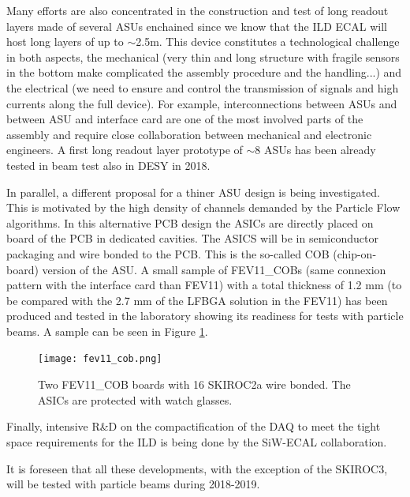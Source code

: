 \documentclass[a4paper,11pt]{article}
\begin{document}
Many efforts are also concentrated in the construction and test of long readout layers
made of several ASUs enchained since we know that the ILD ECAL will host long layers of up to $\sim$2.5m.
This device constitutes a technological challenge in both aspects, the mechanical
(very thin and long structure with fragile sensors in the bottom make complicated the assembly procedure and the handling...)
and the electrical (we need to ensure and control the transmission of signals and high currents along the full device).
For example, interconnections between ASUs and between ASU and interface card are one of
the most involved parts of the assembly
and require close collaboration between mechanical and electronic engineers.
A first long readout layer prototype
of $\sim8$ ASUs has been already tested in beam test also in DESY in 2018.

In parallel, a different proposal for a thiner ASU
design is being investigated. This is motivated by the high density of channels
demanded by the Particle Flow algorithms. 
In this alternative PCB design the ASICs
are directly placed on board of the PCB in dedicated cavities.
The ASICS will be in semiconductor packaging and wire bonded to the PCB. This is the so-called COB (chip-on-board) version of the ASU.
A small sample of FEV11\_COBs (same connexion pattern with the interface card than FEV11)
with a total thickness of 1.2 mm (to be compared with the 2.7 mm of the LFBGA solution in the FEV11)
has been produced and tested in the laboratory
showing its readiness for tests with particle beams. A sample can be seen in Figure \ref{cob}.

\begin{figure}[!t]
  \centering
    \texttt{[image: fev11\_cob.png]} 
  \caption{Two FEV11\_COB boards with 16 SKIROC2a wire bonded. The ASICs are protected with watch glasses.}
\label{cob}
\end{figure}

Finally, intensive R\&D on the compactification of
the DAQ to meet the tight space requirements for the ILD is being done by the SiW-ECAL collaboration.

It is foreseen that all these developments, with the exception of the SKIROC3, will be tested with particle beams during 2018-2019.


\acknowledgments
\end{document}
